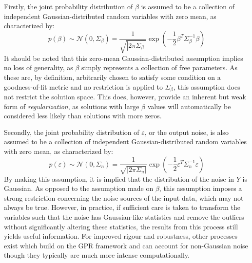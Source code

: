 \documentclass{article}
\begin{document}
Firstly, the joint probability distribution of $\beta$ is assumed to be a collection of independent Gaussian-distributed random variables with zero mean, as characterized by:
\begin{equation}
\label{eq:GaussianParameterAssumption}
	p\!\left(\beta\right) \sim \mathcal{N}\!\left(0,\Sigma_\beta\right) = \frac{1}{\sqrt{\left|2 \pi \Sigma_\beta\right|}} \exp\!\left(-\frac{1}{2} \beta^T \Sigma_\beta^{-1} \beta\right)
\end{equation}
It should be noted that this zero-mean Gaussian-distributed assumption implies no loss of generality, as $\beta$ simply represents a collection of free parameters. As these are, by definition, arbitrarily chosen to satisfy some condition on a goodness-of-fit metric and no restriction is applied to $\Sigma_\beta$, this assumption does not restrict the solution space. This does, however, provide an inherent but weak form of \emph{regularization}, as solutions with large $\beta$ values will automatically be considered less likely than solutions with more zeros.

Secondly, the joint probability distribution of $\varepsilon$, or the output noise, is also assumed to be a collection of independent Gaussian-distributed random variables with zero mean, as characterized by:
\begin{equation}
\label{eq:GaussianOutputNoiseAssumption}
	p\!\left(\varepsilon\right) \sim \mathcal{N}\!\left(0,\Sigma_n\right) = \frac{1}{\sqrt{\left|2 \pi \Sigma_n\right|}} \exp\!\left(-\frac{1}{2} \varepsilon^T \Sigma_n^{-1} \varepsilon\right)
\end{equation}
By making this assumption, it is implied that the distribution of the noise in $Y$ is Gaussian. As opposed to the assumption made on $\beta$, this assumption imposes a strong restriction concerning the noise sources of the input data, which may not always be true. However, in practice, if sufficient care is taken to transform the variables such that the noise has Gaussian-like statistics and remove the outliers without significantly altering these statistics, the results from this process still yields useful information. For improved rigour and robustness, other processes exist which build on the GPR framework and can account for non-Gaussian noise though they typically are much more intense computationally.
\end{document}
